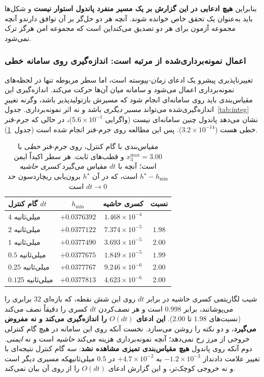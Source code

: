 \documentclass[10pt,twocolumn]{article}
\newcommand{\en}[1]{\lr{#1}}
\newcommand{\md}{\lr{\textemdash}}
\newcommand{\nd}{\lr{\textendash}}
\begin{document}
بنابراین \textbf{هیچ ادعایی در این گزارش بر یک مسیر منفرد پاندول استوار نیست}
و شکل‌ها باید به‌عنوان یک تحقق خاص خوانده شوند. آنچه هر دو حل‌گر بر آن توافق
دارند\md{}و آنچه مجموعه آزمون برای هر دو تصدیق می‌کند\md{}این است که مجموعه امن هرگز
ترک نمی‌شود.

\subsubsection{اعمال نمونه‌برداری‌شده از مرتبه \en{$O(dt)$} است: اندازه‌گیری روی سامانه خطی}
\label{sec:dt}
تغییرناپذیری پیشرو یک ادعای \emph{زمان-پیوسته} است، اما سطر مربوطه تنها در
لحظه‌های نمونه‌برداری اعمال می‌شود و سامانه میان آن‌ها حرکت می‌کند. اندازه‌گیری این
مقیاس‌بندی باید روی سامانه‌ای انجام شود که مسیرش بازتولیدپذیر باشد، وگرنه تغییرِ
اندازه‌گیری‌شده می‌تواند \emph{مسیر دیگری} باشد و نه اثر نمونه‌برداری. جدول~\ref{tab:integ}
نشان می‌دهد پاندول چنین سامانه‌ای نیست (واگرایی $5.6\times10^{-1}$)، در حالی که
جرم-فنر خطی هست ($3.2\times10^{-14}$). پس این مطالعه روی جرم-فنر انجام شده است
(جدول~\ref{tab:dt}).

\begin{table}[H]
    \centering
    \caption{مقیاس‌بندی با گام کنترل، روی جرم-فنر \emph{خطی} با $x_3^{\max}=3.00$ و
    قطب‌های ثابت. هر سطر اکیداً ایمن است؛ آنچه با $dt$ مقیاس می‌گیرد \emph{کسری حاشیه}
    $h^\star-h_{\min}$ است، که در آن $h^\star$ برون‌یابی ریچاردسون حد $dt\to0$ است}
    \label{tab:dt}
    \small
    \begin{tabular}{lccc}
        \toprule
        گام کنترل $dt$ & $h_{\min}$ & کسری حاشیه & نسبت \\
        \midrule
        $4$ میلی‌ثانیه     & $+0.0376392$ & $1.468\times10^{-4}$ & \nd{} \\
        $2$ میلی‌ثانیه     & $+0.0377122$ & $7.374\times10^{-5}$ & $1.98$ \\
        $1$ میلی‌ثانیه     & $+0.0377490$ & $3.693\times10^{-5}$ & $2.00$ \\
        $0.5$ میلی‌ثانیه   & $+0.0377675$ & $1.849\times10^{-5}$ & $1.99$ \\
        $0.25$ میلی‌ثانیه  & $+0.0377767$ & $9.246\times10^{-6}$ & $2.00$ \\
        $0.125$ میلی‌ثانیه & $+0.0377813$ & $4.623\times10^{-6}$ & $2.00$ \\
        \bottomrule
    \end{tabular}
\end{table}

شیب لگاریتمی کسری حاشیه در برابر $dt$ روی این شش نقطه، که بازه‌ای $32$ برابری را
می‌پوشانند، برابر $\mathbf{0.998}$ است و هر نصف‌کردن $dt$ کسری را دقیقاً نصف می‌کند
(نسبت‌های $1.98$ تا $2.00$). \textbf{این ادعای $O(dt)$ را اندازه‌گیری می‌کند و نه
مفروض می‌گیرد}، و دو نکته را روشن می‌سازد. نخست آنکه روی این سامانه در هیچ گام
کنترلی خروجی از مرز رخ نمی‌دهد؛ آنچه نمونه‌برداری هزینه می‌کند \emph{حاشیه} است و نه
\emph{ایمنی}. دوم آنکه روی پاندول \textbf{هیچ مقیاس‌بندی تمیزی مشاهده نشد}: سه گام کنترل
نتیجه‌ای با تغییر علامت دادند\md{}از $-1.2\times10^{-3}$ به $+4.7\times10^{-2}$ در $0.5$
میلی‌ثانیه\md{}که مسیری دیگر است و نه خروجی کوچک‌تر، و این گزارش ادعای $O(dt)$ را از روی
آن بیان نمی‌کند.
\end{document}
